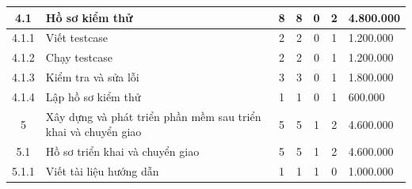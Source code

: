 \begin{longtable}{|c|p{3cm}|c|c|c|c|p{3cm}|}
    4.1                             & Hồ sơ kiểm thử                                                & 8                                              & 8                                               & 0                                                               & 2                  & 4.800.000  \\ \hline
    4.1.1                           & Viết testcase                                                 & 2                                              & 2                                               & 0                                                               & 1                  & 1.200.000  \\ \hline
    4.1.2                           & Chạy testcase                                                 & 2                                              & 2                                               & 0                                                               & 1                  & 1.200.000  \\ \hline
    4.1.3                           & Kiểm tra và sửa lỗi                                           & 3                                              & 3                                               & 0                                                               & 1                  & 1.800.000  \\ \hline
    4.1.4                           & Lập hồ sơ kiểm thử                                            & 1                                              & 1                                               & 0                                                               & 1                  & 600.000    \\ \hline
    5                               & Xây dựng và phát triển phần mềm sau triển khai và chuyển giao & 5                                              & 5                                               & 1                                                               & 2                  & 4.600.000  \\ \hline
    5.1                             & Hồ sơ triển khai và chuyển giao                               & 5                                              & 5                                               & 1                                                               & 2                  & 4.600.000  \\ \hline
    5.1.1                           & Viết tài liệu hướng dẫn                                       & 1                                              & 1                                               & 1                                                               & 0                  & 1.000.000  \\ \hline

\end{longtable}
